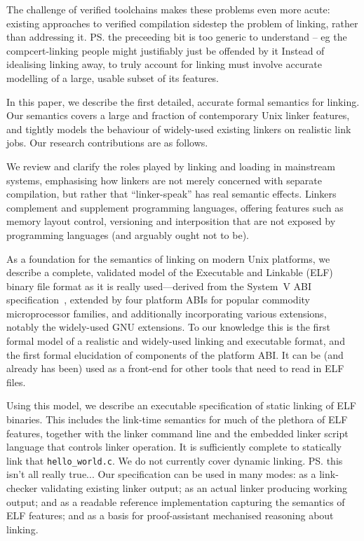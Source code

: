 The challenge of verified toolchains makes these problems even more acute: existing
approaches to verified compilation sidestep the problem of linking, rather than addressing it.
\ps{the preceeding bit is too generic to understand -- eg the compcert-linking
  people might justifiably just be offended by it}
Instead of idealising linking away, to truly account for linking must involve accurate modelling of a large, usable subset of its features.

In this paper, we describe the first detailed, accurate formal semantics for linking. 
Our semantics covers a large and fraction of contemporary Unix linker features, and tightly models the behaviour of widely-used existing linkers on realistic link jobs.
Our research contributions are as follows.

\begin{verytightitemize}
\item
We review and clarify the roles played by linking and loading in mainstream systems, emphasising
how linkers are not merely concerned with separate compilation, but rather that ``linker-speak'' has real semantic effects.
Linkers complement and supplement programming languages, offering
features such as memory layout control, versioning and interposition that are not exposed by programming languages (and arguably ought not to be).

\item As a foundation for the semantics of linking on modern Unix
  platforms, we describe a complete, validated  model of the
  Executable and Linkable (ELF) binary file format as it is really used---derived from the System~V ABI specification~\cite{elf-sco-model}, extended by four platform ABIs for popular commodity microprocessor families, and additionally incorporating various extensions, notably the widely-used GNU extensions. 
To our knowledge this is the first formal model of a realistic and
widely-used linking and executable format, and the first formal
elucidation of components of the platform ABI.  It can be (and already
has been) used as a front-end for other tools that need to read in ELF files.

\item Using this model, we describe an executable specification of static linking of ELF binaries.
This includes the link-time semantics for much of the plethora of ELF features, 
together with the linker command line and the embedded linker script language
that controls linker operation.  It is sufficiently complete to
statically link that 
\texttt{hello\_world.c}.
We do not currently cover dynamic linking.
\ps{this isn't all really true...}
Our specification can be used in many modes: 
as a link-checker validating existing linker output; 
as an actual linker producing working output; 
and as a readable reference implementation capturing the semantics of ELF features; 
and as a basis for proof-assistant mechanised reasoning about
linking. 
\end{verytightitemize}

